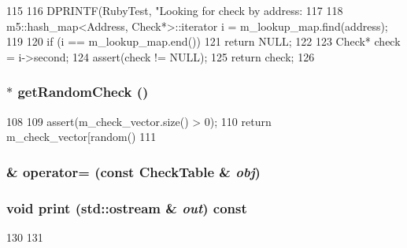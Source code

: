 \begin{DoxyCode}
115 {
116     DPRINTF(RubyTest, "Looking for check by address: %
117 
118     m5::hash_map<Address, Check*>::iterator i = m_lookup_map.find(address);
119 
120     if (i == m_lookup_map.end())
121         return NULL;
122 
123     Check* check = i->second;
124     assert(check != NULL);
125     return check;
126 }
\end{DoxyCode}
\hypertarget{classCheckTable_a5fe64727ae5d3d896fd48784401d4f68}{
\subsubsection[{getRandomCheck}]{ $\ast$ getRandomCheck ()}}
\label{classCheckTable_a5fe64727ae5d3d896fd48784401d4f68}



\begin{DoxyCode}
108 {
109     assert(m_check_vector.size() > 0);
110     return m_check_vector[random() %
111 }
\end{DoxyCode}
\hypertarget{classCheckTable_a706745367fb31497ca5823e17715f995}{
\subsubsection[{operator=}]{\& operator= (const {\bf CheckTable} \& {\em obj})}}
\label{classCheckTable_a706745367fb31497ca5823e17715f995}
\hypertarget{classCheckTable_ac55fe386a101fbae38c716067c9966a0}{
\subsubsection[{print}]{\setlength{\rightskip}{0pt plus 5cm}void print (std::ostream \& {\em out}) const}}
\label{classCheckTable_ac55fe386a101fbae38c716067c9966a0}



\begin{DoxyCode}
130 {
131 }
\end{DoxyCode}


